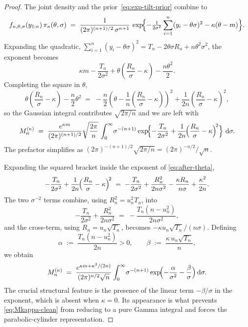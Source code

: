 \documentclass[numsec,webpdf,modern,medium,namedate]{oup-authoring-template}
\theoremstyle{thmstyleone}%
\theoremstyle{thmstyletwo}%
\theoremstyle{thmstylethree}%
\newcommand{\dd}{\,\mathrm{d}}
\newcommand{\1}{\mathbf{1}}
\begin{document}
\begin{proof}
The joint density and the prior~\eqref{eq:exp-tilt-prior} combine to
\begin{equation}\label{eq:integrand}
  f_{n,\theta,\sigma}(y_{1:n})\,\pi_\kappa(\theta,\sigma)
  \;=\;\frac{1}{(2\pi)^{(n+1)/2}\,\sigma^{n+1}}\,
  \exp\!\Bigl\{-\tfrac{1}{2\sigma^2}\sum_{i=1}^n(y_i-\theta\sigma)^2
  -\kappa(\theta-m)\Bigr\}.
\end{equation}
Expanding the quadratic, $\sum_{i=1}^n(y_i-\theta\sigma)^2
=T_n-2\theta\sigma R_n+n\theta^2\sigma^2$, the exponent becomes
\[
  \kappa m-\frac{T_n}{2\sigma^2}
  +\theta\!\left(\frac{R_n}{\sigma}-\kappa\right)-\frac{n\theta^2}{2}.
\]
Completing the square in $\theta$,
\[
  \theta\!\left(\frac{R_n}{\sigma}-\kappa\right)-\frac{n}{2}\theta^2
  \;=\;-\frac{n}{2}\!\left(\theta-\frac{1}{n}\!\left(\frac{R_n}{\sigma}-\kappa\right)\right)^{\!2}
  +\frac{1}{2n}\!\left(\frac{R_n}{\sigma}-\kappa\right)^{\!2}\!,
\]
so the Gaussian integral contributes $\sqrt{2\pi/n}$
and we are left with
\begin{equation}\label{eq:after-theta}
  M_n^{(\kappa)}
  \;=\;\frac{e^{\kappa m}}{(2\pi)^{(n+1)/2}}\sqrt{\frac{2\pi}{n}}\,
  \int_0^\infty\!\sigma^{-(n+1)}
  \exp\!\Bigl\{-\frac{T_n}{2\sigma^2}
  +\frac{1}{2n}\!\Bigl(\frac{R_n}{\sigma}-\kappa\Bigr)^{\!2}\Bigr\}\,\dd\sigma.
\end{equation}
The prefactor simplifies as $(2\pi)^{-(n+1)/2}\sqrt{2\pi/n}
=(2\pi)^{-n/2}/\sqrt n$.

Expanding the squared bracket inside the exponent of
\eqref{eq:after-theta},
\[
  -\frac{T_n}{2\sigma^2}
  +\frac{1}{2n}\!\Bigl(\frac{R_n}{\sigma}-\kappa\Bigr)^{\!2}
  \;=\;-\frac{T_n}{2\sigma^2}+\frac{R_n^2}{2n\sigma^2}
  -\frac{\kappa R_n}{n\sigma}+\frac{\kappa^2}{2n}.
\]
The two $\sigma^{-2}$ terms combine, using $R_n^2=u_n^2 T_n$, into
\[
  -\frac{T_n}{2\sigma^2}+\frac{R_n^2}{2n\sigma^2}
  \;=\;-\frac{T_n(n-u_n^2)}{2n\sigma^2},
\]
and the cross-term, using $R_n=u_n\sqrt{T_n}$, becomes
$-\kappa u_n\sqrt{T_n}/(n\sigma)$. Defining
\begin{equation}\label{eq:ab}
  \alpha\;:=\;\frac{T_n(n-u_n^2)}{2n}>0,\qquad
  \beta\;:=\;\frac{\kappa\,u_n\sqrt{T_n}}{n},
\end{equation}
we obtain
\begin{equation}\label{eq:Mkappa-clean}
  M_n^{(\kappa)}
  \;=\;\frac{e^{\kappa m+\kappa^2/(2n)}}{(2\pi)^{n/2}\sqrt n}
  \int_0^\infty\!\sigma^{-(n+1)}
  \exp\!\Bigl(-\frac{\alpha}{\sigma^2}-\frac{\beta}{\sigma}\Bigr)\dd\sigma.
\end{equation}
The crucial structural feature is the presence of the linear term
$-\beta/\sigma$ in the exponent, which is absent when $\kappa=0$. Its
appearance is what prevents \eqref{eq:Mkappa-clean} from reducing to a
pure Gamma integral and forces the parabolic-cylinder representation.


\end{proof}
\end{document}

